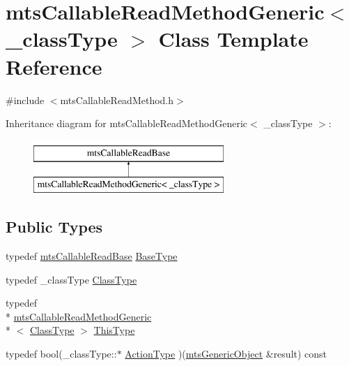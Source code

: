 \hypertarget{classmts_callable_read_method_generic}{\section{mts\-Callable\-Read\-Method\-Generic$<$ \-\_\-class\-Type $>$ Class Template Reference}
\label{classmts_callable_read_method_generic}
}


{\ttfamily \#include $<$mts\-Callable\-Read\-Method.\-h$>$}

Inheritance diagram for mts\-Callable\-Read\-Method\-Generic$<$ \-\_\-class\-Type $>$\-:\begin{figure}[H]
\begin{center}
\leavevmode
\includegraphics[height=2.000000cm]{d1/dd3/classmts_callable_read_method_generic}
\end{center}
\end{figure}
\subsection*{Public Types}
\begin{DoxyCompactItemize}
\item 
typedef \hyperlink{classmts_callable_read_base}{mts\-Callable\-Read\-Base} \hyperlink{classmts_callable_read_method_generic_ade696274218351d03e90dd1d7609d575}{Base\-Type}
\item 
typedef \-\_\-class\-Type \hyperlink{classmts_callable_read_method_generic_afa0ef401d0f5538af2f0fe114ad9202d}{Class\-Type}
\item 
typedef \\*
\hyperlink{classmts_callable_read_method_generic}{mts\-Callable\-Read\-Method\-Generic}\\*
$<$ \hyperlink{classmts_callable_read_method_generic_afa0ef401d0f5538af2f0fe114ad9202d}{Class\-Type} $>$ \hyperlink{classmts_callable_read_method_generic_a4fa11906c9156401ae37307545a10f80}{This\-Type}
\item 
typedef bool(\-\_\-class\-Type\-::$\ast$ \hyperlink{classmts_callable_read_method_generic_adb570e75fc2af331a2cc2b8e6104b959}{Action\-Type} )(\hyperlink{classmts_generic_object}{mts\-Generic\-Object} \&result) const 
\end{DoxyCompactItemize}
